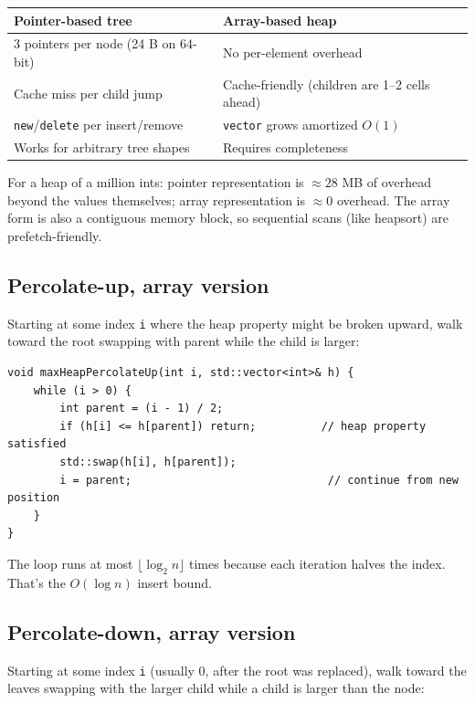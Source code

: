 \documentclass[11pt]{article}
\begin{document}
\begin{center}
\begin{tabular}{ll}
Pointer-based tree       & Array-based heap \\
\hline
3 pointers per node (24 B on 64-bit) & No per-element overhead \\
Cache miss per child jump           & Cache-friendly (children are 1--2 cells ahead) \\
\texttt{new}/\texttt{delete} per insert/remove & \texttt{vector} grows amortized $O(1)$ \\
Works for arbitrary tree shapes     & Requires completeness \\
\end{tabular}
\end{center}

For a heap of a million ints: pointer representation is $\approx 28$ MB of overhead beyond the values themselves; array representation is $\approx 0$ overhead. The array form is also a contiguous memory block, so sequential scans (like heapsort) are prefetch-friendly.

\subsection*{Percolate-up, array version}

Starting at some index \texttt{i} where the heap property might be broken upward, walk toward the root swapping with parent while the child is larger:

\begin{lstlisting}
void maxHeapPercolateUp(int i, std::vector<int>& h) {
    while (i > 0) {
        int parent = (i - 1) / 2;
        if (h[i] <= h[parent]) return;          // heap property satisfied
        std::swap(h[i], h[parent]);
        i = parent;                              // continue from new position
    }
}
\end{lstlisting}

The loop runs at most $\lfloor \log_2 n \rfloor$ times because each iteration halves the index. That's the $O(\log n)$ insert bound.

\subsection*{Percolate-down, array version}

Starting at some index \texttt{i} (usually 0, after the root was replaced), walk toward the leaves swapping with the larger child while a child is larger than the node:
\end{document}
